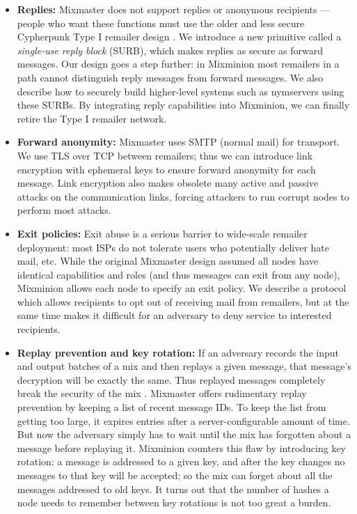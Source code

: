 \documentclass[11pt]{IEEEtran}
\begin{document}
\begin{itemize}
\item \textbf{Replies:} Mixmaster does not support replies or anonymous
recipients --- people who want these functions must use the older and
less secure Cypherpunk Type I remailer design \cite{remailer-history}. We
introduce a new primitive called a \emph{single-use reply block} (SURB),
which makes replies as secure as forward messages. Our design goes a
step further: in Mixminion most remailers in a path cannot distinguish
reply messages from forward messages. We also describe how to securely
build higher-level systems such as nymservers using these SURBs. By
integrating reply capabilities into Mixminion, we can finally retire
the Type I remailer network.

\item \textbf{Forward anonymity:} Mixmaster uses SMTP (normal mail) for
transport. We use TLS over TCP between remailers; thus we can introduce
link encryption with ephemeral keys to ensure forward anonymity for
each message. Link encryption also makes obsolete many active and
passive attacks on the communication links, forcing attackers to run
corrupt nodes to perform most attacks.


\item \textbf{Exit policies:} Exit abuse is a serious barrier to wide-scale
remailer deployment: most ISPs do not tolerate users who potentially
deliver hate mail, etc. While the original Mixmaster design assumed all
nodes have identical capabilities and roles (and thus messages can exit
from any node), Mixminion allows each node to specify an exit policy. We
describe a protocol which allows recipients to opt out of receiving mail
from remailers, but at the same time makes it difficult for an adversary
to deny service to interested recipients.

\item \textbf{Replay prevention and key rotation:} 
If an adversary records the input and output batches of a mix and then
replays a given message, that message's decryption will be exactly the
same. Thus replayed messages completely break the security of the mix
\cite{chaum-mix}. Mixmaster offers rudimentary replay prevention by
keeping a list of recent message IDs. To keep the list from getting too
large, it expires entries after a server-configurable amount of time. But
now the adversary simply has to wait until the mix has forgotten about a
message before replaying it. Mixminion counters this flaw by introducing
key rotation: a message is addressed to a given key, and after the key
changes no messages to that key will be accepted; so the mix can forget
about all the messages addressed to old keys. It turns out that the
number of hashes a node needs to remember between key rotations is not
too great a burden.


\end{itemize}
\end{document}
